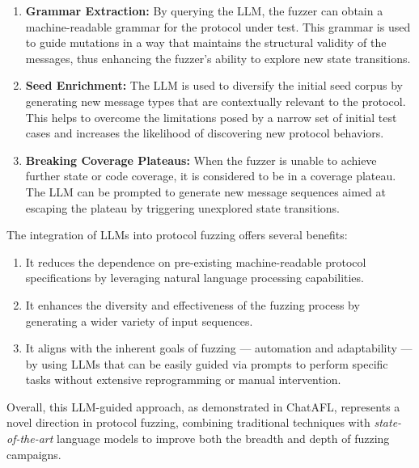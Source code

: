 \begin{enumerate}
    \item \textbf{Grammar Extraction:} By querying the LLM, the fuzzer can obtain a machine-readable grammar for the protocol under test. This grammar is used to guide mutations in a way that maintains the structural validity of the messages, thus enhancing the fuzzer's ability to explore new state transitions.

    \item \textbf{Seed Enrichment:} The LLM is used to diversify the initial seed corpus by generating new message types that are contextually relevant to the protocol. This helps to overcome the limitations posed by a narrow set of initial test cases and increases the likelihood of discovering new protocol behaviors.

    \item \textbf{Breaking Coverage Plateaus:} When the fuzzer is unable to achieve further state or code coverage, it is considered to be in a coverage plateau. The LLM can be prompted to generate new message sequences aimed at escaping the plateau by triggering unexplored state transitions.
\end{enumerate}
The integration of LLMs into protocol fuzzing offers several benefits:
\begin{enumerate}
    \item It reduces the dependence on pre-existing machine-readable protocol specifications by leveraging natural language processing capabilities.
    \item It enhances the diversity and effectiveness of the fuzzing process by generating a wider variety of input sequences.
    \item It aligns with the inherent goals of fuzzing — automation and adaptability — by using LLMs that can be easily guided via prompts to perform specific tasks without extensive reprogramming or manual intervention.
\end{enumerate}
Overall, this LLM-guided approach, as demonstrated in ChatAFL, represents a novel direction in protocol fuzzing, combining traditional techniques with \textit{state-of-the-art} language models to improve both the breadth and depth of fuzzing campaigns.



